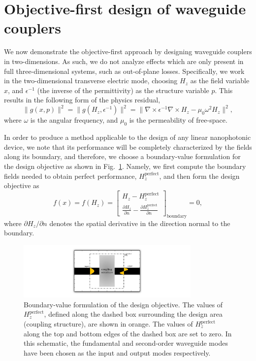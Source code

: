 \section{Objective-first design of waveguide couplers}
We now demonstrate the objective-first approach
    by designing waveguide couplers in two-dimensions.
As such, we do not analyze effects which are only present in full 
    three-dimensional systems, such as out-of-plane losses.
Specifically, we work in the two-dimensional transverse electric mode,
    choosing $H_z$ as the field variable $x$,
    and $\epsilon^{-1}$ (the inverse of the permittivity) 
    as the structure variable $p$.
This results in the following form of the physics residual,
    \begin{equation}
    \|g(x,p)\|^2 = 
    \|g(H_z, \epsilon^{-1})\|^2 = 
    \| \nabla \times \epsilon^{-1} \nabla \times H_z - \mu_0 \omega^2 H_z \|^2,
    \end{equation}
    where $\omega$ is the angular frequency,
    and $\mu_0$ is the permeability of free-space.

In order to produce a method applicable 
    to the design of any linear nanophotonic device,
    we note that its performance
    will be completely characterized by the fields along its boundary,
    and therefore, 
    we choose a boundary-value formulation for the design objective 
    as shown in Fig.~\ref{fig:intro}.
Namely, we first compute the boundary fields needed to obtain
    perfect performance, $H_z^\text{perfect}$,
    and then form the design objective as
    \begin{equation}
    f(x) = f(H_z) = \begin{bmatrix}
        H_z - H_z^\text{perfect} \\
        \frac{\partial H_z}{\partial n} - 
            \frac{\partial H_z^\text{perfect}}{\partial n}
        \end{bmatrix}_\text{boundary}
        = 0,
    \end{equation}
    where $\partial H_z / \partial n$ 
    denotes the spatial derivative in the direction normal to the boundary.

\begin{figure}[htb]
    \centering
    \includegraphics[width=0.8\textwidth]{p3/intro} 
    \caption{Boundary-value formulation of the design objective.
        The values of $H_z^\text{perfect}$, 
            defined along the dashed box surrounding the design area
            (coupling structure), 
            are shown in orange. 
        The values of $H_z^\text{perfect}$ along the top and bottom edges
            of the dashed box are set to zero.
        In this schematic, the fundamental and second-order waveguide modes
            have been chosen as the input and output modes respectively.}
    \label{fig:intro}
\end{figure}
    
